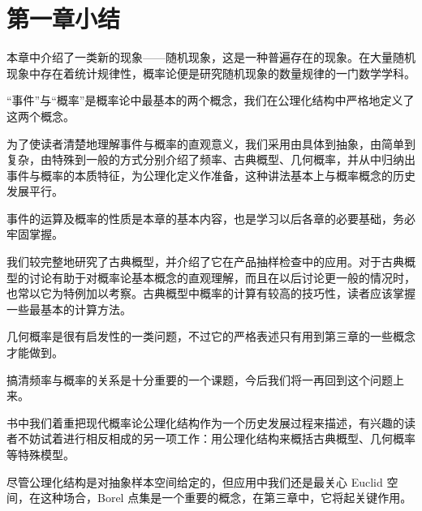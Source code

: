 \documentclass[../../main.tex]{subfiles}
\begin{document}
\section*{第一章小结}\label{section:ch01-小结}

本章中介绍了一类新的现象——随机现象，这是一种普遍存在的现象。在大量随机现象中存在着统计规律性，概率论便是研究随机现象的数量规律的一门数学学科。

``事件''与``概率''是概率论中最基本的两个概念，我们在公理化结构中严格地定义了这两个概念。

为了使读者清楚地理解事件与概率的直观意义，我们采用由具体到抽象，由简单到复杂，由特殊到一般的方式分别介绍了频率、古典概型、几何概率，并从中归纳出事件与概率的本质特征，为公理化定义作准备，这种讲法基本上与概率概念的历史发展平行。

事件的运算及概率的性质是本章的基本内容，也是学习以后各章的必要基础，务必牢固掌握。

我们较完整地研究了古典概型，并介绍了它在产品抽样检查中的应用。对于古典概型的讨论有助于对概率论基本概念的直观理解，而且在以后讨论更一般的情况时，也常以它为特例加以考察。古典概型中概率的计算有较高的技巧性，读者应该掌握一些最基本的计算方法。

几何概率是很有启发性的一类问题，不过它的严格表述只有用到第三章的一些概念才能做到。

搞清频率与概率的关系是十分重要的一个课题，今后我们将一再回到这个问题上来。

书中我们着重把现代概率论公理化结构作为一个历史发展过程来描述，有兴趣的读者不妨试着进行相反相成的另一项工作：用公理化结构来概括古典概型、几何概率等特殊模型。

尽管公理化结构是对抽象样本空间给定的，但应用中我们还是最关心 Euclid 空间，在这种场合，Borel 点集是一个重要的概念，在第三章中，它将起关键作用。
\end{document}
